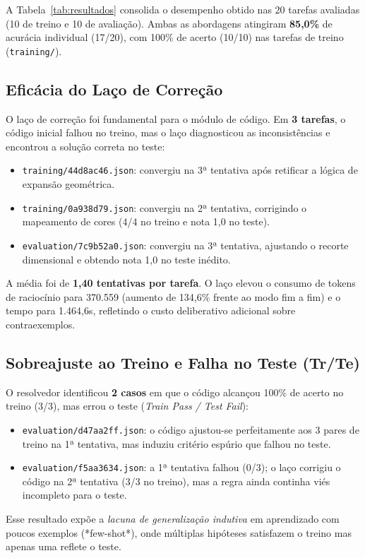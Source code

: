 \documentclass{article}
\begin{document}
A Tabela~\ref{tab:resultados} consolida o desempenho obtido nas 20 tarefas avaliadas (10 de treino e 10 de avaliação). Ambas as abordagens atingiram \textbf{85,0\%} de acurácia individual (17/20), com 100\% de acerto (10/10) nas tarefas de treino (\texttt{training/}).

\subsection{Eficácia do Laço de Correção}
O laço de correção foi fundamental para o módulo de código. Em \textbf{3 tarefas}, o código inicial falhou no treino, mas o laço diagnosticou as inconsistências e encontrou a solução correta no teste:
\begin{itemize}
    \item \texttt{training/44d8ac46.json}: convergiu na 3ª tentativa após retificar a lógica de expansão geométrica.
    \item \texttt{training/0a938d79.json}: convergiu na 2ª tentativa, corrigindo o mapeamento de cores (4/4 no treino e nota 1,0 no teste).
    \item \texttt{evaluation/7c9b52a0.json}: convergiu na 3ª tentativa, ajustando o recorte dimensional e obtendo nota 1,0 no teste inédito.
\end{itemize}
A média foi de \textbf{1,40 tentativas por tarefa}. O laço elevou o consumo de tokens de raciocínio para 370.559 (aumento de 134,6\% frente ao modo fim a fim) e o tempo para 1.464,6s, refletindo o custo deliberativo adicional sobre contraexemplos.

\subsection{Sobreajuste ao Treino e Falha no Teste (Tr/Te)}
O resolvedor identificou \textbf{2 casos} em que o código alcançou 100\% de acerto no treino (3/3), mas errou o teste (\textit{Train Pass / Test Fail}):
\begin{itemize}
    \item \texttt{evaluation/d47aa2ff.json}: o código ajustou-se perfeitamente aos 3 pares de treino na 1ª tentativa, mas induziu critério espúrio que falhou no teste.
    \item \texttt{evaluation/f5aa3634.json}: a 1ª tentativa falhou (0/3); o laço corrigiu o código na 2ª tentativa (3/3 no treino), mas a regra ainda continha viés incompleto para o teste.
\end{itemize}
Esse resultado expõe a \textit{lacuna de generalização indutiva} em aprendizado com poucos exemplos (*few-shot*), onde múltiplas hipóteses satisfazem o treino mas apenas uma reflete o teste.
\end{document}
